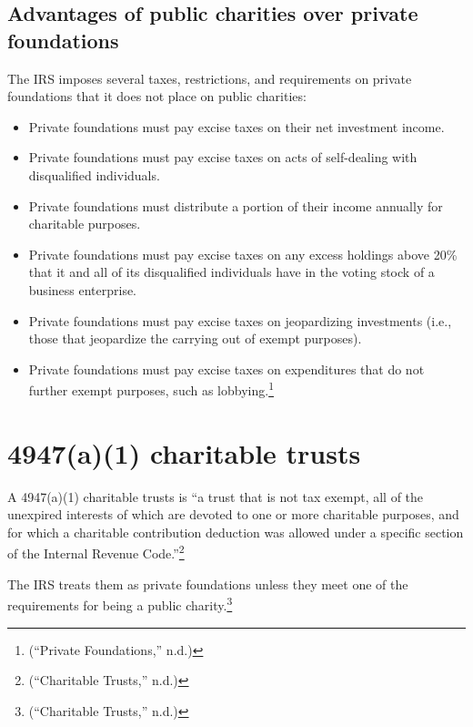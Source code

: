 \documentclass[
  letterpaper,
  DIV=11,
  numbers=noendperiod]{scrreprt}
\begin{document}
\hypertarget{advantages-of-public-charities-over-private-foundations}{%
\subsection{Advantages of public charities over private
foundations}\label{advantages-of-public-charities-over-private-foundations}}

The IRS imposes several taxes, restrictions, and requirements on private
foundations that it does not place on public charities:

\begin{itemize}
\item
  Private foundations must pay excise taxes on their net investment
  income.
\item
  Private foundations must pay excise taxes on acts of self-dealing with
  disqualified individuals.
\item
  Private foundations must distribute a portion of their income annually
  for charitable purposes.
\item
  Private foundations must pay excise taxes on any excess holdings above
  20\% that it and all of its disqualified individuals have in the
  voting stock of a business enterprise.
\item
  Private foundations must pay excise taxes on jeopardizing investments
  (i.e., those that jeopardize the carrying out of exempt purposes).
\item
  Private foundations must pay excise taxes on expenditures that do not
  further exempt purposes, such as lobbying.\footnote{({``Private
    Foundations,''} n.d.)}
\end{itemize}

\hypertarget{a1-charitable-trusts}{%
\section{4947(a)(1) charitable trusts}\label{a1-charitable-trusts}}

A 4947(a)(1) charitable trusts is ``a trust that is not tax exempt, all
of the unexpired interests of which are devoted to one or more
charitable purposes, and for which a charitable contribution deduction
was allowed under a specific section of the Internal Revenue
Code.''\footnote{({``Charitable Trusts,''} n.d.)}

The IRS treats them as private foundations unless they meet one of the
requirements for being a public charity.\footnote{({``Charitable
  Trusts,''} n.d.)}
\end{document}
